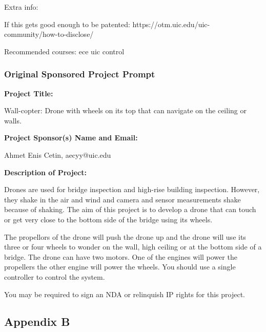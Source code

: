 \documentclass[12pt]{article}
\begin{document}
                \noindent Extra info:

                If this gets good enough to be patented: https://otm.uic.edu/uic-community/how-to-disclose/

                Recommended courses: ece uic control
            
            \subsubsection{Original Sponsored Project Prompt}

                \noindent\textbf{\large Project Title:}

                Wall-copter: Drone with wheels on its top that can navigate on the ceiling or walls.

                \noindent\textbf{\large Project Sponsor(s) Name and Email:}

                Ahmet Enis Cetin, aecyy@uic.edu

                \noindent\textbf{\large Description of Project:}

                Drones are used for bridge inspection and high-rise building inspection. However, they shake in the air and wind and camera and sensor measurements shake because of shaking. The aim of this project is to develop a drone that can touch or get very close to the bottom side of the bridge using its wheels.

                The propellors of the drone will push the drone up and the drone will use its three or four wheels to wonder on the wall, high ceiling or at the bottom side of a bridge. The drone can have two motors. One of the engines will power the propellers the other engine will power the wheels. You should use a single controller to control the system.

                You may be required to sign an NDA or relinquish IP rights for this project.
        
        \newpage
        \subsection{Appendix B}
            \newcommand{\ieeestd}[3]{
                \noindent\textbf{#1} \\
                \noindent\url{#2} \\
                \noindent#3 \\
                \vspace{0.5cm}

            }
\end{document}
